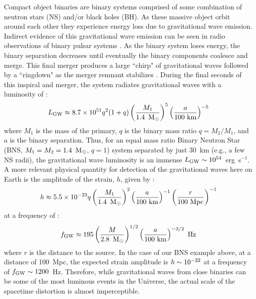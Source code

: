 Compact object binaries are binary systems comprised of some combination of neutron stars (NS) and/or black holes (BH). As these massive object orbit around each other they experience energy loss due to gravitational wave emission. Indirect evidence of this gravitational wave emission can be seen in radio observations of binary pulsar systems \citep{HulseTaylor75,Weisberg+05}. As the binary system loses energy, the binary separation decreases until eventually the binary components coalesce and merge. This final merger produces a large ``chirp" of gravitational waves followed by a ``ringdown" as the merger remnant stabilizes \citep{Centrella+10}. During the final seconds of this inspiral and merger, the system radiates gravitational waves with a luminosity of \citep{FaberRasio12}:
\begin{equation}
\label{eq:intro_gwlum}
L_{\rm GW} \approx 8.7 \times 10^{51} q^2 (1+q) \left ( \frac{M_1}{1.4~\msun} \right )^5 \left ( \frac{a}{100~{\rm km}} \right )^{-5}
\end{equation}
\noindent where $M_1$ is the mass of the primary, $q$ is the binary mass ratio $q = M_2 / M_1$, and $a$ is the binary separation. Thus, for an equal mass ratio Binary Neutron Star (BNS, $M_1 = M_2 = 1.4~{\rm\,M_\odot}$, $q = 1$) system separated by just 30~km (e.g., a few NS radii), the gravitational wave luminosity is an immense $L_{\rm GW} \sim 10^{54}$~erg~s$^{-1}$. A more relevant physical quantity for detection of the gravitational waves here on Earth is the amplitude of the strain, $h$, given by \citep{FaberRasio12}:
\begin{equation}
\label{eq:intro_gwh}
h \approx 5.5 \times 10^{-23} q \left ( \frac{M_1}{1.4~\msun} \right )^2 \left ( \frac{a}{100~{\rm km}} \right )^{-1} \left ( \frac{r}{100~{\rm Mpc}} \right )^{-1}
\end{equation}
\noindent at a frequency of \citep{FaberRasio12}:
\begin{equation}
\label{eq:intro_gwf}
f_{\rm GW} \approx 195 \left ( \frac{M}{2.8~\msun} \right )^{1/2} \left ( \frac{a}{100~{\rm km}} \right )^{-3/2}~{\rm Hz}
\end{equation}
\noindent where $r$ is the distance to the source. In the case of our BNS example above, at a distance of 100~Mpc, the expected strain amplitude is $h \sim 10^{-22}$ at a frequency of $f_{\rm GW} \sim 1200$~Hz. Therefore, while gravitational waves from close binaries can be some of the most luminous events in the Universe, the actual scale of the spacetime distortion is almost imperceptible.

